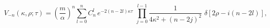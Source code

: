 \begin{equation}\label{V(k,k)3}
V_{-n}(\kappa,\rho;\tau)=\left(\frac{m}{\alpha}\right)^{n}\sum_{l=0}^nC_n^l\,
e^{-2(n-2l)\kappa\tau}\,\,\prod_{j=0}^{l-1} \frac{1}{4\kappa^2+(n-2j)^2}
\,\,\delta[2\rho-i(n-2l)],
\end{equation}

